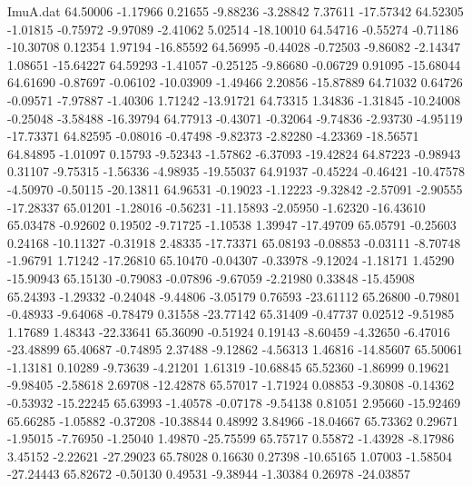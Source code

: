 \begin{filecontents}{ImuA.dat}
  64.50006   -1.17966    0.21655   -9.88236   -3.28842    7.37611  -17.57342
  64.52305   -1.01815   -0.75972   -9.97089   -2.41062    5.02514  -18.10010
  64.54716   -0.55274   -0.71186  -10.30708    0.12354    1.97194  -16.85592
  64.56995   -0.44028   -0.72503   -9.86082   -2.14347    1.08651  -15.64227
  64.59293   -1.41057   -0.25125   -9.86680   -0.06729    0.91095  -15.68044
  64.61690   -0.87697   -0.06102  -10.03909   -1.49466    2.20856  -15.87889
  64.71032    0.64726   -0.09571   -7.97887   -1.40306    1.71242  -13.91721
  64.73315    1.34836   -1.31845  -10.24008   -0.25048   -3.58488  -16.39794
  64.77913   -0.43071   -0.32064   -9.74836   -2.93730   -4.95119  -17.73371
  64.82595   -0.08016   -0.47498   -9.82373   -2.82280   -4.23369  -18.56571
  64.84895   -1.01097    0.15793   -9.52343   -1.57862   -6.37093  -19.42824
  64.87223   -0.98943    0.31107   -9.75315   -1.56336   -4.98935  -19.55037
  64.91937   -0.45224   -0.46421  -10.47578   -4.50970   -0.50115  -20.13811
  64.96531   -0.19023   -1.12223   -9.32842   -2.57091   -2.90555  -17.28337
  65.01201   -1.28016   -0.56231  -11.15893   -2.05950   -1.62320  -16.43610
  65.03478   -0.92602    0.19502   -9.71725   -1.10538    1.39947  -17.49709
  65.05791   -0.25603    0.24168  -10.11327   -0.31918    2.48335  -17.73371
  65.08193   -0.08853   -0.03111   -8.70748   -1.96791    1.71242  -17.26810
  65.10470   -0.04307   -0.33978   -9.12024   -1.18171    1.45290  -15.90943
  65.15130   -0.79083   -0.07896   -9.67059   -2.21980    0.33848  -15.45908
  65.24393   -1.29332   -0.24048   -9.44806   -3.05179    0.76593  -23.61112
  65.26800   -0.79801   -0.48933   -9.64068   -0.78479    0.31558  -23.77142
  65.31409   -0.47737    0.02512   -9.51985    1.17689    1.48343  -22.33641
  65.36090   -0.51924    0.19143   -8.60459   -4.32650   -6.47016  -23.48899
  65.40687   -0.74895    2.37488   -9.12862   -4.56313    1.46816  -14.85607
  65.50061   -1.13181    0.10289   -9.73639   -4.21201    1.61319  -10.68845
  65.52360   -1.86999    0.19621   -9.98405   -2.58618    2.69708  -12.42878
  65.57017   -1.71924    0.08853   -9.30808   -0.14362   -0.53932  -15.22245
  65.63993   -1.40578   -0.07178   -9.54138    0.81051    2.95660  -15.92469
  65.66285   -1.05882   -0.37208  -10.38844    0.48992    3.84966  -18.04667
  65.73362    0.29671   -1.95015   -7.76950   -1.25040    1.49870  -25.75599
  65.75717    0.55872   -1.43928   -8.17986    3.45152   -2.22621  -27.29023
  65.78028    0.16630    0.27398  -10.65165    1.07003   -1.58504  -27.24443
  65.82672   -0.50130    0.49531   -9.38944   -1.30384    0.26978  -24.03857

\end{filecontents}
